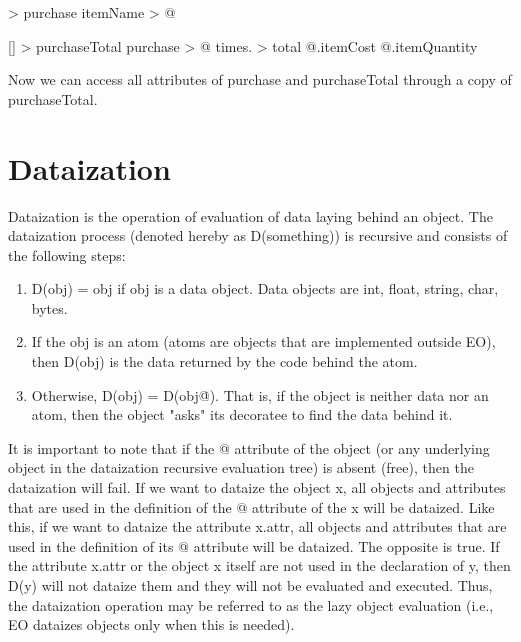 \documentclass[12pt]{book}
\begin{document}
\begin{ffcode}
 > purchase
  itemName > @

[] > purchaseTotal
  purchase > @
  times. > total
    @.itemCost
    @.itemQuantity
\end{ffcode}

Now we can access all attributes of purchase and purchaseTotal through a copy of purchaseTotal.

\section{Dataization}
Dataization is the operation of evaluation of data laying behind an object. The dataization process (denoted hereby as D(something)) is recursive and consists of the following steps:

\begin{enumerate}
    \item D(obj) = obj if obj is a data object. Data objects are int, float, string, char, bytes.
    \item If the obj is an atom (atoms are objects that are implemented outside EO), then D(obj) is the data returned by the code behind the atom.
    \item Otherwise, D(obj) = D(obj\.@). That is, if the object is neither data nor an atom, then the object "asks" its decoratee to find the data behind it.
\end{enumerate}

It is important to note that if the @ attribute of the object (or any underlying object in the dataization recursive evaluation tree) is absent (free), then the dataization will fail.
If we want to dataize the object x, all objects and attributes that are used in the definition of the @ attribute of the x will be dataized. Like this, if we want to dataize the attribute x.attr, all objects and attributes that are used in the definition of its @ attribute will be dataized.
The opposite is true. If the attribute x.attr or the object x itself are not used in the declaration of y, then D(y) will not dataize them and they will not be evaluated and executed. Thus, the dataization operation may be referred to as the lazy object evaluation (i.e., EO dataizes objects only when this is needed).
\end{document}
